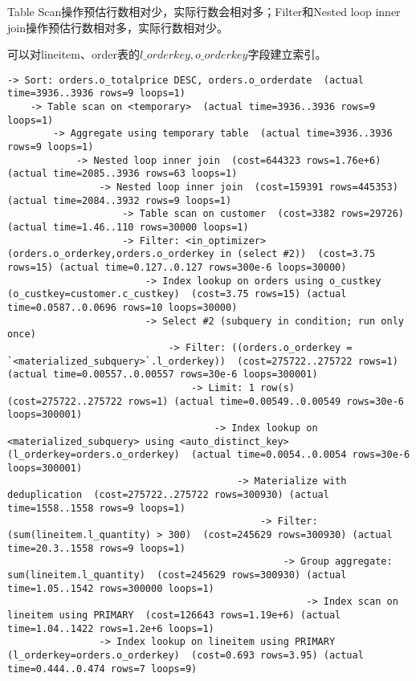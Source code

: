 \documentclass{article}
\begin{document}
Table Scan操作预估行数相对少，实际行数会相对多；Filter和Nested loop inner join操作预估行数相对多，实际行数相对少。

可以对lineitem、order表的$l\_orderkey,o\_orderkey$字段建立索引。

\begin{lstlisting}
-> Sort: orders.o_totalprice DESC, orders.o_orderdate  (actual time=3936..3936 rows=9 loops=1)
    -> Table scan on <temporary>  (actual time=3936..3936 rows=9 loops=1)
        -> Aggregate using temporary table  (actual time=3936..3936 rows=9 loops=1)
            -> Nested loop inner join  (cost=644323 rows=1.76e+6) (actual time=2085..3936 rows=63 loops=1)
                -> Nested loop inner join  (cost=159391 rows=445353) (actual time=2084..3932 rows=9 loops=1)
                    -> Table scan on customer  (cost=3382 rows=29726) (actual time=1.46..110 rows=30000 loops=1)
                    -> Filter: <in_optimizer>(orders.o_orderkey,orders.o_orderkey in (select #2))  (cost=3.75 rows=15) (actual time=0.127..0.127 rows=300e-6 loops=30000)
                        -> Index lookup on orders using o_custkey (o_custkey=customer.c_custkey)  (cost=3.75 rows=15) (actual time=0.0587..0.0696 rows=10 loops=30000)
                        -> Select #2 (subquery in condition; run only once)
                            -> Filter: ((orders.o_orderkey = `<materialized_subquery>`.l_orderkey))  (cost=275722..275722 rows=1) (actual time=0.00557..0.00557 rows=30e-6 loops=300001)
                                -> Limit: 1 row(s)  (cost=275722..275722 rows=1) (actual time=0.00549..0.00549 rows=30e-6 loops=300001)
                                    -> Index lookup on <materialized_subquery> using <auto_distinct_key> (l_orderkey=orders.o_orderkey)  (actual time=0.0054..0.0054 rows=30e-6 loops=300001)
                                        -> Materialize with deduplication  (cost=275722..275722 rows=300930) (actual time=1558..1558 rows=9 loops=1)
                                            -> Filter: (sum(lineitem.l_quantity) > 300)  (cost=245629 rows=300930) (actual time=20.3..1558 rows=9 loops=1)
                                                -> Group aggregate: sum(lineitem.l_quantity)  (cost=245629 rows=300930) (actual time=1.05..1542 rows=300000 loops=1)
                                                    -> Index scan on lineitem using PRIMARY  (cost=126643 rows=1.19e+6) (actual time=1.04..1422 rows=1.2e+6 loops=1)
                -> Index lookup on lineitem using PRIMARY (l_orderkey=orders.o_orderkey)  (cost=0.693 rows=3.95) (actual time=0.444..0.474 rows=7 loops=9)
\end{lstlisting}
\end{document}
